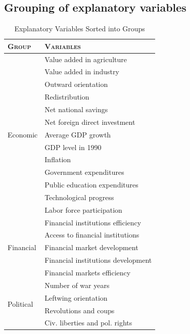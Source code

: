 \documentclass[a4paper,11pt]{article}
\begin{document}
\subsection*{Grouping of explanatory variables}
\begin{table}[ht!]
\footnotesize
\caption{Explanatory Variables Sorted into Groups}
\label{tab:groups}
\centering
\begin{tabular}{ll}
  \toprule
  \textsc{Group} & \textsc{Variables} \\
  \midrule
  \multirow{13}{*}{Economic}   & Value added in agriculture \\
                & Value added in industry \\
                & Outward orientation \\
                & Redistribution \\
                & Net national savings  \\
                & Net foreign direct investment \\
                & Average GDP growth \\
                & GDP level in 1990 \\
                & Inflation \\
                & Government expenditures \\
                & Public education expenditures \\
                & Technological progress \\
                & Labor force participation \\

  \midrule
  \multirow{5}{*}{Financial}   & Financial institutions efficiency \\
                & Access to financial institutions  \\ 
                & Financial market development \\
                & Financial institutions development \\
                & Financial markets efficiency \\
    
  \midrule
  \multirow{4}{*}{Political}  & Number of war years  \\
                & Leftwing orientation \\
                & Revolutions and coups \\
                & Civ. liberties and pol. rights \\


\end{tabular}
\end{table}
\end{document}
